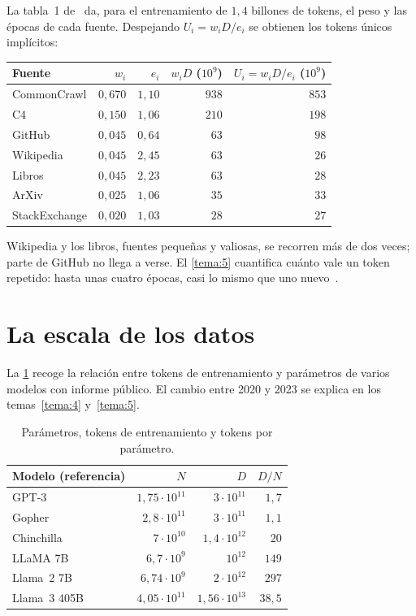 \begin{ejemplo}\label{ej:llama-mezcla}
La tabla~1 de~\cite{llama} da, para el entrenamiento de $1{,}4$ billones de tokens, el peso y las épocas de cada fuente. Despejando $U_i=w_iD/e_i$ se obtienen los tokens únicos implícitos:
\begin{center}\small
\begin{tabular}{@{}lrrrr@{}}
\toprule
Fuente & $w_i$ & $e_i$ & $w_iD$ ($10^{9}$) & $U_i=w_iD/e_i$ ($10^{9}$) \\
\midrule
CommonCrawl & $0{,}670$ & $1{,}10$ & $938$ & $853$ \\
C4 & $0{,}150$ & $1{,}06$ & $210$ & $198$ \\
GitHub & $0{,}045$ & $0{,}64$ & $63$ & $98$ \\
Wikipedia & $0{,}045$ & $2{,}45$ & $63$ & $26$ \\
Libros & $0{,}045$ & $2{,}23$ & $63$ & $28$ \\
ArXiv & $0{,}025$ & $1{,}06$ & $35$ & $33$ \\
StackExchange & $0{,}020$ & $1{,}03$ & $28$ & $27$ \\
\bottomrule
\end{tabular}
\end{center}
Wikipedia y los libros, fuentes pequeñas y valiosas, se recorren más de dos veces; parte de GitHub no llega a verse. El \cref{tema:5} cuantifica cuánto vale un token repetido: hasta unas cuatro épocas, casi lo mismo que uno nuevo~\cite{muennighoff}.
\end{ejemplo}

\section{La escala de los datos}

La \cref{tab:tokens-param} recoge la relación entre tokens de entrenamiento y parámetros de varios modelos con informe público. El cambio entre 2020 y 2023 se explica en los temas~\ref{tema:4} y~\ref{tema:5}.

\begin{table}[h]
\centering\small
\caption{Parámetros, tokens de entrenamiento y tokens por parámetro.}\label{tab:tokens-param}
\begin{tabular}{@{}lrrr@{}}
\toprule
Modelo (referencia) & $N$ & $D$ & $D/N$ \\
\midrule
GPT-3~\cite{brown} & $1{,}75\cdot 10^{11}$ & $3\cdot 10^{11}$ & $1{,}7$ \\
Gopher~\cite{rae} & $2{,}8\cdot 10^{11}$ & $3\cdot 10^{11}$ & $1{,}1$ \\
Chinchilla~\cite{hoffmann} & $7\cdot 10^{10}$ & $1{,}4\cdot 10^{12}$ & $20$ \\
LLaMA 7B~\cite{llama} & $6{,}7\cdot 10^{9}$ & $10^{12}$ & $149$ \\
Llama~2 7B~\cite{llama2} & $6{,}74\cdot 10^{9}$ & $2\cdot 10^{12}$ & $297$ \\
Llama~3 405B~\cite{llama3} & $4{,}05\cdot 10^{11}$ & $1{,}56\cdot 10^{13}$ & $38{,}5$ \\
\bottomrule
\end{tabular}
\end{table}

